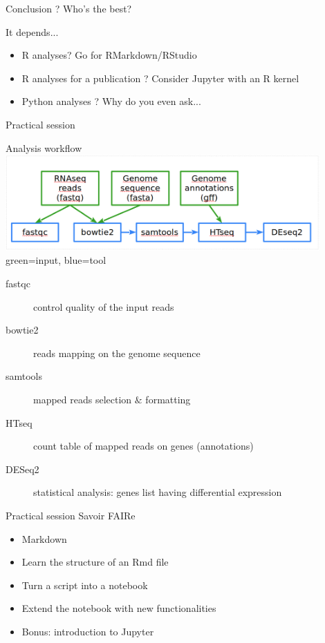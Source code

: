 \begin{frame}{Conclusion ?}
Who's the best? \newline \pause 

It depends... \pause

\begin{itemize}
    \item<2-> R analyses? Go for RMarkdown/RStudio
    \item<3-> R analyses for a publication ? Consider Jupyter with an R kernel
    \item<4-> Python analyses ? Why do you even ask... 
\end{itemize}

\end{frame}

\begin{frame}{Practical session}
\begin{block}{Analysis workflow}
    \includegraphics[width=12cm]{01_introduction/images/FAIR_RNAseq_WF.png}\\
green=input, blue=tool
\end{block}
\footnotesize{
\begin{description}
    \item[fastqc] control quality of the input reads
    \item[bowtie2] reads mapping on the genome sequence
    \item[samtools] mapped reads selection $\&$ formatting
    \item[HTseq] count table of mapped reads on genes (annotations)
    \item[DESeq2] statistical analysis: genes list having differential expression
\end{description}
}
\end{frame}

\begin{frame}{Practical session}
Savoir FAIRe

\begin{itemize}
  \item Markdown
  \item Learn the structure of an Rmd file
  \item Turn a script into a notebook
  \item Extend the notebook with new functionalities
  \item Bonus: introduction to Jupyter
\end{itemize}
\end{frame}

